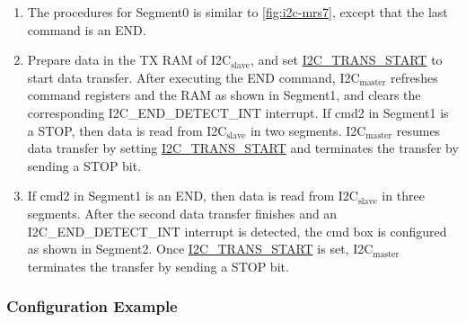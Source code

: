 \documentclass[main\_\_EN.tex]{subfiles}
\begin{document}
\begin{enumerate}
    \item The procedures for Segment0 is similar to \ref{fig:i2c-mrs7}, except that the last command is an END.
    \item Prepare data in the TX RAM of I2C$_\text{slave}$, and set \hyperref[fielddesc:I2CTRANSSTART]{I2C\_TRANS\_START} to start data transfer. After executing the END command, I2C$_\text{master}$ refreshes command registers and the RAM as shown in Segment1, and clears the corresponding I2C\_END\_DETECT\_INT interrupt. If cmd2 in Segment1 is a STOP, then data is read from I2C$_\text{slave}$ in two segments. I2C$_\text{master}$ resumes data transfer by setting \hyperref[fielddesc:I2CTRANSSTART]{I2C\_TRANS\_START} and terminates the transfer by sending a STOP bit.
    \item If cmd2 in Segment1 is an END, then data is read from I2C$_\text{slave}$ in three segments. After the second data transfer finishes and an I2C\_END\_DETECT\_INT interrupt is detected, the cmd box is configured as shown in Segment2. Once \hyperref[fielddesc:I2CTRANSSTART]{I2C\_TRANS\_START} is set, I2C$_\text{master}$ terminates the transfer by sending a STOP bit.
\end{enumerate}

\subsubsection{Configuration Example}
\end{document}
